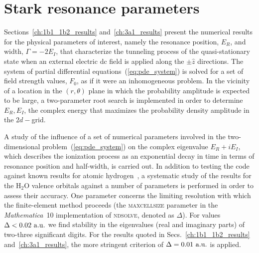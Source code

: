 


\section{Stark resonance parameters}
\label{ch:stark_params}

Sections~\ref{ch:1b1_1b2_results} and~\ref{ch:3a1_results} present the
numerical results for the physical parameters of interest, namely the
resonance position, $E_{R}$, and width, $\Gamma = -2E_{I}$, that
characterize the tunneling process of the quasi-stationary state when
an external electric dc field is applied along the $\pm\hat{z}$
directions. The system of partial differential
equations~(\ref{eq:pde_system}) is solved for a set of field strength
values, $F_{0}$, as if it were an inhomogeneous problem. In the
vicinity of a location in the $(r,\theta)$ plane in which the
probability amplitude is expected to be large, a two-parameter root
search is implemented in order to determine ${E_{R}, E_{I}}$, the
complex energy that maximizes the probability density amplitude in the
$2d-$grid.

A study of the influence of a set of numerical parameters involved in
the two-dimensional problem~(\ref{eq:pde_system}) on the complex
eigenvalue $E_{R}+iE_{I}$, which describes the ionization process as
an exponential decay in time in terms of resonance position and
half-width, is carried out. In addition to testing the code against
known results for atomic hydrogen~\cite{Telnov_1989}, a systematic
study of the results for the H$_{2}$O valence orbitals against a
number of parameters is performed in order to assess their
accuracy. One parameter concerns the limiting resolution with which
the finite-element method proceeds (the \textsc{maxcellsize} parameter
in the \emph{Mathematica}~10 implementation of \textsc{ndsolve},
denoted as $\Delta$). For values $\Delta < 0.02\ \rm{a.u.}$ we find
stability in the eigenvalues (real and imaginary parts) of two-three
significant digits. For the results quoted in
Secs.~\ref{ch:1b1_1b2_results} and~\ref{ch:3a1_results}, the more
stringent criterion of $\Delta=0.01\ \rm{a.u.}$ is applied.

